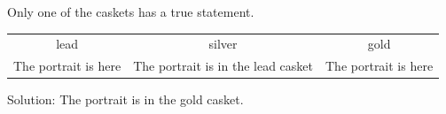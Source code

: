 Only one of the caskets has a true statement.
\begin{tabular}{ccc}
\toprule
lead & silver & gold\\
The portrait is here & The portrait is in the lead casket & The portrait is here\\
\bottomrule
\end{tabular}
Solution: The portrait is in the gold casket.